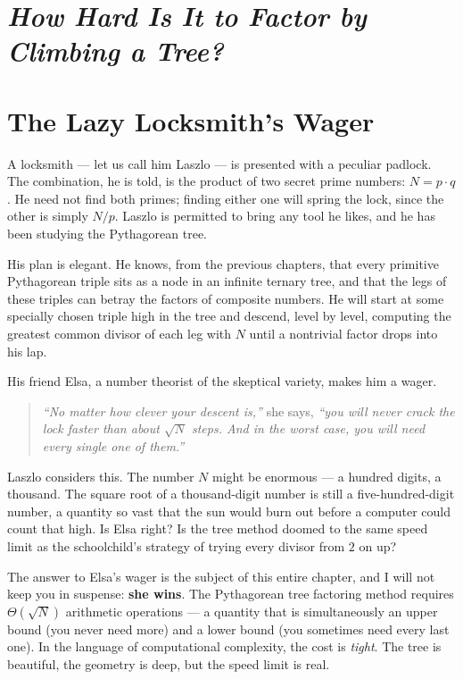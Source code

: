 \section{\texorpdfstring{\emph{How Hard Is It to Factor by Climbing a Tree?}}{How Hard Is It to Factor by Climbing a Tree?}}\label{ch8-how-hard-is-it-to-factor-by-climbing-a-tree}



\section{The Lazy Locksmith's Wager}\label{ch8-the-lazy-locksmiths-wager}

A locksmith --- let us call him Laszlo --- is presented with a peculiar padlock. The combination, he is told, is the product of two secret prime numbers: \(N = p \cdot q\). He need not find both primes; finding either one will spring the lock, since the other is simply \(N / p\). Laszlo is permitted to bring any tool he likes, and he has been studying the Pythagorean tree.

His plan is elegant. He knows, from the previous chapters, that every primitive Pythagorean triple sits as a node in an infinite ternary tree, and that the legs of these triples can betray the factors of composite numbers. He will start at some specially chosen triple high in the tree and descend, level by level, computing the greatest common divisor of each leg with \(N\) until a nontrivial factor drops into his lap.

His friend Elsa, a number theorist of the skeptical variety, makes him a wager.

\begin{quote}
\emph{``No matter how clever your descent is,''} she says, \emph{``you will never crack the lock faster than about \(\sqrt{N}\) steps. And in the worst case, you will need every single one of them.''}
\end{quote}

Laszlo considers this. The number \(N\) might be enormous --- a hundred digits, a thousand. The square root of a thousand-digit number is still a five-hundred-digit number, a quantity so vast that the sun would burn out before a computer could count that high. Is Elsa right? Is the tree method doomed to the same speed limit as the schoolchild's strategy of trying every divisor from \(2\) on up?

The answer to Elsa's wager is the subject of this entire chapter, and I will not keep you in suspense: \textbf{she wins}. The Pythagorean tree factoring method requires \(\Theta(\sqrt{N})\) arithmetic operations --- a quantity that is simultaneously an upper bound (you never need more) and a lower bound (you sometimes need every last one). In the language of computational complexity, the cost is \emph{tight}. The tree is beautiful, the geometry is deep, but the speed limit is real.

